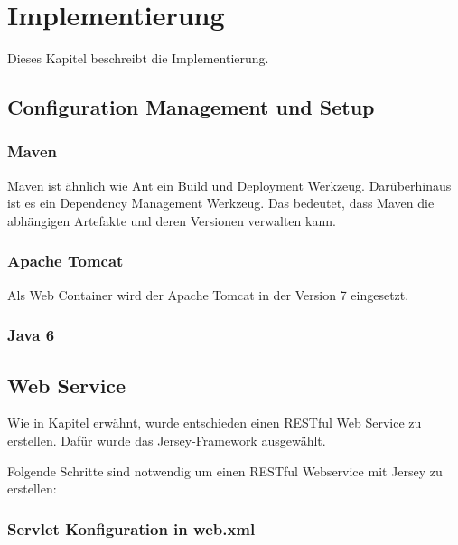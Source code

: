 \chapter{Implementierung} \label{kap:implementierung}

Dieses Kapitel beschreibt die Implementierung. 

\section{Configuration Management und Setup}

\subsection{Maven}
Maven ist ähnlich wie Ant ein Build und Deployment Werkzeug. Darüberhinaus ist es ein Dependency Management Werkzeug. Das bedeutet, dass Maven die abhängigen Artefakte und deren Versionen verwalten kann. 

\subsection{Apache Tomcat}
Als Web Container wird der \gls{Apache Tomcat} in der Version 7 eingesetzt. 

\subsection{Java 6}

\section{Web Service}\label{kap:webservice}

Wie in Kapitel  erwähnt, wurde entschieden einen \gls{REST}ful Web Service zu erstellen. Dafür wurde das Jersey-Framework ausgewählt.

Folgende Schritte sind notwendig um einen \gls{REST}ful Webservice mit Jersey zu erstellen: 

\subsection{Servlet Konfiguration in web.xml} 

